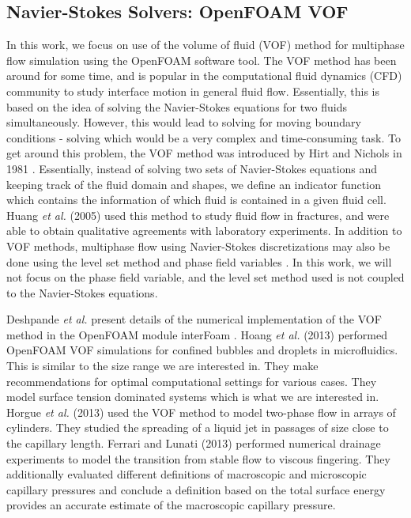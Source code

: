 \subsection{Navier-Stokes Solvers: OpenFOAM VOF}

In this work, we focus on use of the volume of fluid (VOF) method for multiphase flow simulation using the OpenFOAM software tool. The VOF method has been around for some time, and is popular in the computational fluid dynamics (CFD) community to study interface motion in general fluid flow. Essentially, this is based on the idea of solving the Navier-Stokes equations for two fluids simultaneously. However, this would lead to solving for moving boundary conditions - solving which would be a very complex and time-consuming task. To get around this problem, the VOF method was introduced by Hirt and Nichols in 1981 \cite{hirt1981volume}. Essentially, instead of solving two sets of Navier-Stokes equations and keeping track of the fluid domain and shapes, we define an indicator function which contains the information of which fluid is contained in a given fluid cell. Huang \emph{et al.} (2005) used this method to study fluid flow in fractures, and were able to obtain qualitative agreements with laboratory experiments. In addition to VOF methods, multiphase flow using Navier-Stokes discretizations may also be done using the level set method \cite{} and phase field variables \cite{}. In this work, we will not focus on the phase field variable, and the level set method used is not coupled to the Navier-Stokes equations.

Deshpande \emph{et al.} present details of the numerical implementation of the VOF method in the OpenFOAM module interFoam \cite{}. Hoang \emph{et al.} (2013) performed OpenFOAM VOF simulations for confined bubbles and droplets in microfluidics. This is similar to the size range we are interested in. They make recommendations for optimal computational settings for various cases. They model surface tension dominated systems which is what we are interested in. Horgue \emph{et al.} (2013) used the VOF method to model two-phase flow in arrays of cylinders. They studied the spreading of a liquid jet in passages of size close to the capillary length. Ferrari and Lunati (2013) performed numerical drainage experiments to model the transition from stable flow to viscous fingering. They additionally evaluated different definitions of macroscopic and microscopic capillary pressures and conclude a definition based on the total surface energy provides an accurate estimate of the macroscopic capillary pressure.

